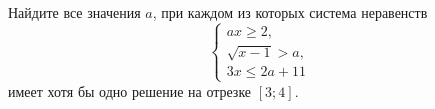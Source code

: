 \begin{ex}
	\begin{condition}
		Найдите все значения \( a \), при каждом из которых система неравенств
		\[ \left\{
		\begin{array}{l}
			ax\ge2,\\
			\sqrt{x-1}>a,\\
			3x\le2a+11
		\end{array}
		\right. \]
		имеет хотя бы одно решение на отрезке \( [3; 4] \).
	\end{condition}
	\answer{\( \left[ \dfrac{1}{2};\sqrt{3} \right) \)}
\end{ex}